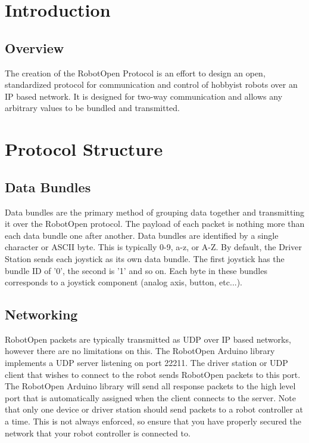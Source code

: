 \documentclass[11pt]{article} %
\begin{document}
\section*{}

\section{Introduction}

\subsection{Overview}
The creation of the RobotOpen Protocol is an effort to design an open, standardized protocol for communication and control of hobbyist robots over an IP based network. It is designed for two-way communication and allows any arbitrary values to be bundled and transmitted.

\section{Protocol Structure}

\subsection{Data Bundles}
Data bundles are the primary method of grouping data together and transmitting it over the RobotOpen protocol. The payload of each packet is nothing more than each data bundle one after another. Data bundles are identified by a single character or ASCII byte. This is typically 0-9, a-z, or A-Z. By default, the Driver Station sends each joystick as its own data bundle. The first joystick has the bundle ID of '0', the second is '1' and so on. Each byte in these bundles corresponds to a joystick component (analog axis, button, etc...).

\subsection{Networking}
RobotOpen packets are typically transmitted as UDP over IP based networks, however there are no limitations on this. The RobotOpen Arduino library implements a UDP server listening on port 22211. The driver station or UDP client that wishes to connect to the robot sends RobotOpen packets to this port. The RobotOpen Arduino library will send all response packets to the high level port that is automatically assigned when the client connects to the server. Note that only one device or driver station should send packets to a robot controller at a time. This is not always enforced, so ensure that you have properly secured the network that your robot controller is connected to.
\end{document}
